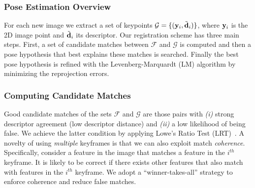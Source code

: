 \subsubsection{Pose Estimation Overview}
\label{sec:registration}
For each new image we extract a set of keypoints $\mathcal{G}=\{(\mathbf{y}_{i},\tilde{\mathbf{d}}_{i})\}$, where $\mathbf{y}_{i}$ is the 2D image point and $\tilde{\mathbf{d}}_{i}$ its descriptor. Our registration scheme has three main steps. First, a set of candidate matches between $\mathcal{F}$ and $\mathcal{G}$ is computed and then a pose hypothesis that best explains these matches is searched. Finally the best pose hypothesis is refined with the Levenberg-Marquardt (LM) algorithm by minimizing the reprojection errors.

\subsubsection{Computing Candidate Matches}
Good candidate matches of the sets $\mathcal{F}$ and $\mathcal{G}$ are those pairs with \textit{(i)} strong descriptor agreement (\ie low descriptor distance) and \textit{(ii)} a low likelihood of being false.
We achieve the latter condition by applying Lowe's Ratio Test (LRT)~\cite{Lowe:2004:DIF:993451.996342}.
A novelty of using \emph{multiple} keyframes is that we can also exploit match \emph{coherence}. 
Specifically, consider a feature in the image that matches a feature in the $i^{th}$ keyframe. 
It is likely to be correct if there exists other features that also match with features in the $i^{th}$ keyframe.
We adopt a ``winner-takes-all'' strategy to enforce coherence and reduce false matches.
